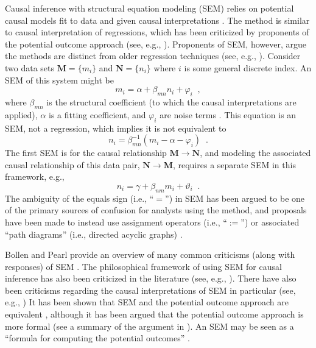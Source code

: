 \documentclass{article}[10pt]
\begin{document}
Causal inference with structural equation modeling (SEM) relies on potential causal models fit to data and given causal interpretations \cite{Anderson1988,Pearl2012,Bollen2013,Bollen2014}.  The method is similar to causal interpretation of regressions, which has been criticized by proponents of the potential outcome approach (see, e.g., \cite{Holland1986}).  Proponents of SEM, however, argue the methods are distinct from older regression techniques (see, e.g., \cite{Bollen2013}).  Consider two data sets $\mathbf{M}=\{ m_i \}$ and $\mathbf{N} = \{ n_i \}$ where $i$ is some general discrete index.  An SEM of this system might be
\begin{equation}
m_i = \alpha + \beta_{mn}n_i + \varphi_i\;\;,
\end{equation}
where $\beta_{mn}$ is the structural coefficient (to which the causal interpretations are applied), $\alpha$ is a fitting coefficient, and $\varphi_i$ are noise terms \cite{Anderson1988,Bollen2013,Bollen2014}.  This equation is an SEM, not a regression, which implies it is not equivalent \cite{Bollen2013} to 
\begin{equation}
n_i = \beta_{mn}^{-1}\left(m_i-\alpha-\varphi_i\right)\;\;.
\end{equation}
The first SEM is for the causal relationship $\mathbf{M}\rightarrow\mathbf{N}$, and modeling the associated causal relationship of this data pair, $\mathbf{N}\rightarrow\mathbf{M}$, requires a separate SEM in this framework, e.g., 
\begin{equation}
n_i = \gamma + \beta_{nm}m_i + \vartheta_i \;\;.
\end{equation}
The ambiguity of the equals sign (i.e., ``$=$'') in SEM has been argued to be one of the primary sources of confusion for analysts using the method, and proposals have been made to instead use assignment operators (i.e., ``$:=$'') \cite{Pearl2012} or associated ``path diagrams'' (i.e., directed acyclic graphs) \cite{Pearl2000}.

Bollen and Pearl provide an overview of many common criticisms (along with responses) of SEM \cite{Bollen2013}.  The philosophical framework of using SEM for causal inference has also been criticized in the literature (see, e.g., \cite{Hall2007,Hitchcock2009}).  There have also been criticisms regarding the causal interpretations of SEM in particular (see, e.g., \cite{Biddle1987,Cliff1983}) It has been shown that SEM and the potential outcome approach are equivalent \cite{Bollen2013,Pearl2000,Morgan2014}, although it has been argued that the potential outcome approach is more formal (see a summary of the argument in \cite{Bollen2013}).  An SEM may be seen as a ``formula for computing the potential outcomes'' \cite{Greenland2002}.
\end{document}
